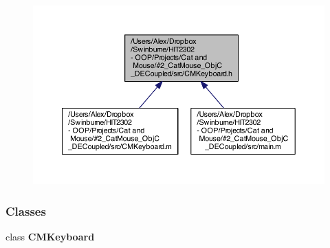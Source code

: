 \begin{figure}[H]
\begin{center}
\leavevmode
\includegraphics[width=350pt]{_c_m_keyboard_8h__dep__incl}
\end{center}
\end{figure}
\subsubsection*{Classes}
\begin{DoxyCompactItemize}
\item 
class {\bf C\-M\-Keyboard}
\end{DoxyCompactItemize}
